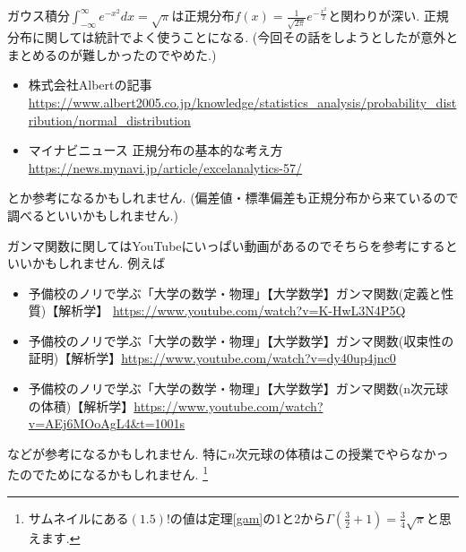 \documentclass[dvipdfmx,a4paper,11pt]{article}
\theoremstyle{definition}
\begin{document}
 \vspace{11pt}
 
ガウス積分$ \int_{-\infty}^{\infty} e^{-x^2}dx = \sqrt{\pi}$は正規分布$f(x)=\frac{1}{\sqrt{2\pi}}e^{-\frac{x^2}{2}}$と関わりが深い.
正規分布に関しては統計でよく使うことになる. (今回その話をしようとしたが意外とまとめるのが難しかったのでやめた.)
\begin{itemize}
\item 株式会社Albertの記事 \url{https://www.albert2005.co.jp/knowledge/statistics_analysis/probability_distribution/normal_distribution}
\item マイナビニュース 正規分布の基本的な考え方 \url{https://news.mynavi.jp/article/excelanalytics-57/} 
\end{itemize}

とか参考になるかもしれません. (偏差値・標準偏差も正規分布から来ているので調べるといいかもしれません.)

ガンマ関数に関してはYouTubeにいっぱい動画があるのでそちらを参考にするといいかもしれません.
例えば
\begin{itemize}
\item 予備校のノリで学ぶ「大学の数学・物理」【大学数学】ガンマ関数(定義と性質)【解析学】 \url{https://www.youtube.com/watch?v=K-HwL3N4P5Q}
\item 予備校のノリで学ぶ「大学の数学・物理」【大学数学】ガンマ関数(収束性の証明)【解析学】\url{https://www.youtube.com/watch?v=dy40up4jnc0}
\item 予備校のノリで学ぶ「大学の数学・物理」【大学数学】ガンマ関数(n次元球の体積)【解析学】\url{https://www.youtube.com/watch?v=AEj6MOoAgL4&t=1001s}
\end{itemize}
などが参考になるかもしれません.
特に$n$次元球の体積はこの授業でやらなかったのでためになるかもしれません.
\footnote{サムネイルにある$(1.5)!$の値は定理\ref{gam}の1と2から$\Gamma(\frac{3}{2}+1)=\frac{3}{4}\sqrt{\pi}$と思えます.}
\end{document}
